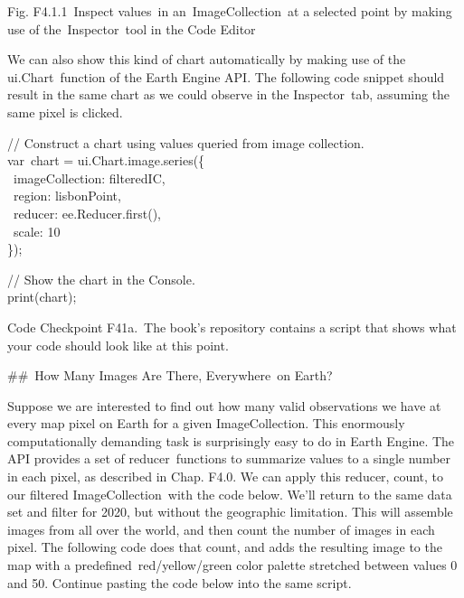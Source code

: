 \documentclass[
  letterpaper,
  DIV=11,
  numbers=noendperiod]{scrreprt}
\begin{document}
Fig. F4.1.1~Inspect values~in an~ImageCollection~at a selected point by
making use of the~Inspector~tool in the Code Editor

We can also show this kind of chart automatically by making use of the
ui.Chart~function of the Earth Engine API. The following code snippet
should result in the same chart as we could observe in the
Inspector~tab, assuming the same pixel is clicked.

// Construct a chart using values queried from image collection.\\
var~chart = ui.Chart.image.series(\{\\
\hspace*{0.333em} ~imageCollection: filteredIC,\\
\hspace*{0.333em} ~region: lisbonPoint,\\
\hspace*{0.333em} ~reducer: ee.Reducer.first(),\\
\hspace*{0.333em} ~scale: 10\\
\});

// Show the chart in the Console.\\
print(chart);

\begin{tcolorbox}[enhanced jigsaw, left=2mm, breakable, rightrule=.15mm, opacityback=0, colframe=quarto-callout-note-color-frame, colbacktitle=quarto-callout-note-color!10!white, arc=.35mm, opacitybacktitle=0.6, toptitle=1mm, colback=white, leftrule=.75mm, title=\textcolor{quarto-callout-note-color}{\faInfo}\hspace{0.5em}{Note}, toprule=.15mm, bottomtitle=1mm, titlerule=0mm, bottomrule=.15mm, coltitle=black]

Code Checkpoint F41a.~The book's repository contains a script that shows
what your code should look like at this point.

\end{tcolorbox}

\#\#~How Many Images Are There, Everywhere~on Earth?

Suppose we are interested to find out how many valid observations we
have at every map pixel on Earth for a given ImageCollection. This
enormously computationally demanding task is surprisingly easy to do in
Earth Engine. The API provides a set of reducer~functions to summarize
values to a single number in each pixel, as described in Chap. F4.0. We
can apply this reducer, count, to our filtered ImageCollection~with the
code below. We'll return to the same data set and filter for 2020, but
without the geographic limitation. This will assemble images from all
over the world, and then count the number of images in each pixel. The
following code does that count, and adds the resulting image to the map
with a predefined~red/yellow/green color palette stretched between
values 0 and 50. Continue pasting the code below into the same script.
\end{document}
